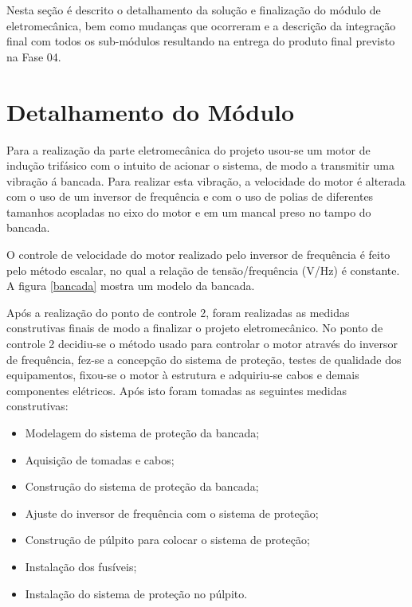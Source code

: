  \label{desenvolvimento_eletromecanica}

Nesta seção é descrito o detalhamento da solução e finalização do módulo de eletromecânica, bem como mudanças que ocorreram e a descrição da integração final com todos os sub-módulos resultando na entrega do produto final previsto na Fase 04.

\section{Detalhamento do Módulo}

Para a realização da parte eletromecânica do projeto usou-se um motor de indução trifásico com o intuito de acionar o sistema, de modo a transmitir uma vibração á bancada. Para realizar esta vibração, a velocidade do motor é alterada com o uso de um inversor de frequência e com o uso de polias de diferentes tamanhos acopladas no eixo do motor e em um mancal preso no tampo do bancada.

O controle de velocidade do motor realizado pelo inversor de frequência é feito pelo método escalar, no qual a relação de tensão/frequência (V/Hz) é constante. A figura \ref{bancada} mostra um modelo da bancada.

Após a realização do ponto de controle 2, foram realizadas as medidas construtivas finais de modo a finalizar o projeto eletromecânico. No ponto de controle 2 decidiu-se o método usado para controlar o motor através do inversor de frequência, fez-se a concepção do sistema de proteção, testes de qualidade dos equipamentos, fixou-se o motor à estrutura e adquiriu-se cabos e demais componentes elétricos. Após isto foram tomadas as seguintes medidas construtivas:
\begin{itemize}
\item Modelagem do sistema de proteção da bancada;
\item Aquisição de tomadas e cabos;
\item Construção do sistema de proteção da bancada;
\item Ajuste do inversor de frequência com o sistema de proteção;
\item Construção de púlpito para colocar o sistema de proteção;
\item Instalação dos fusíveis;
\item Instalação do sistema de proteção no púlpito.
\end{itemize}

